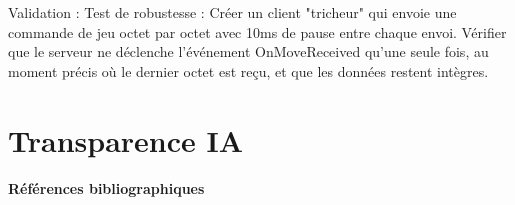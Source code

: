 \documentclass[12pt,a4paper,titlepage,oneside]{article}
\begin{document}
    Validation : Test de robustesse : Créer un client "tricheur" qui envoie une commande de jeu octet par octet avec 10ms de pause entre chaque envoi. Vérifier que le serveur ne déclenche l'événement OnMoveReceived qu'une seule fois, au moment précis où le dernier octet est reçu, et que les données restent intègres.
    
    \part{Transparence IA}

    \newpage
    \markboth{}{} 
    
    
    \begin{flushleft}
        \huge\bfseries Références bibliographiques
    \end{flushleft}
    \vspace{1.5cm} %

    \nocite{*} 
    \printbibliography[heading=none]

    \appendix
\end{document}
